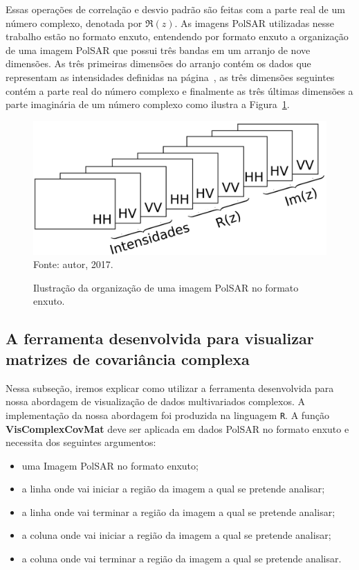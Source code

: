 \documentclass[journal]{IEEEtran}
\begin{document}
Essas operações de correlação e desvio padrão são feitas com a parte real de um número complexo, denotada por $\Re(z)$. As imagens Pol{SAR} utilizadas nesse trabalho estão no formato enxuto, entendendo por formato enxuto a organização de uma imagem PolSAR que possui três bandas em um arranjo de nove dimensões. As três primeiras dimensões do arranjo contém os dados que representam as intensidades definidas na página~\pageref{intensidades}, as três dimensões seguintes contém a parte real do número complexo e finalmente as três últimas dimensões a parte imaginária de um número complexo como ilustra a Figura~\ref{camadas}.

\begin{figure}[!htb]
\centering
\caption{Ilustração da organização de uma imagem Pol{SAR} no formato enxuto.}
\includegraphics[width=\linewidth]{../../Images/camadas.png}\\
Fonte: autor, 2017.
\label{camadas}
\end{figure}  

\subsection{A ferramenta desenvolvida para visualizar matrizes de covariância complexa}\label{ferramenta}

Nessa subseção, iremos explicar como utilizar a ferramenta desenvolvida para nossa abordagem de visualização de dados multivariados complexos. A implementação da nossa abordagem foi produzida na linguagem {\tt R}. A função \textbf{VisComplexCovMat} deve ser aplicada em dados PolSAR no formato enxuto e necessita dos seguintes argumentos:
\begin{itemize}
\item uma Imagem PolSAR no formato enxuto;
\item a linha onde vai iniciar a região da imagem a qual se pretende analisar;
\item a linha onde vai terminar a região da imagem a qual se pretende analisar;  
\item a coluna onde vai iniciar a região da imagem a qual se pretende analisar;
\item a coluna onde vai terminar a região da imagem a qual se pretende analisar. 
\end{itemize}
\end{document}
